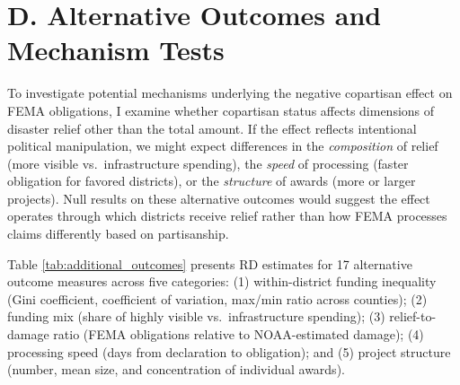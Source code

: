 \documentclass[12pt,letterpaper,oneside]{book}
\begin{document}

\section*{D. Alternative Outcomes and Mechanism Tests}

To investigate potential mechanisms underlying the negative copartisan effect on FEMA obligations, I examine whether copartisan status affects dimensions of disaster relief other than the total amount. If the effect reflects intentional political manipulation, we might expect differences in the \textit{composition} of relief (more visible vs.\ infrastructure spending), the \textit{speed} of processing (faster obligation for favored districts), or the \textit{structure} of awards (more or larger projects). Null results on these alternative outcomes would suggest the effect operates through which districts receive relief rather than how FEMA processes claims differently based on partisanship.

Table \ref{tab:additional_outcomes} presents RD estimates for 17 alternative outcome measures across five categories: (1) within-district funding inequality (Gini coefficient, coefficient of variation, max/min ratio across counties); (2) funding mix (share of highly visible vs.\ infrastructure spending); (3) relief-to-damage ratio (FEMA obligations relative to NOAA-estimated damage); (4) processing speed (days from declaration to obligation); and (5) project structure (number, mean size, and concentration of individual awards).
\end{document}
